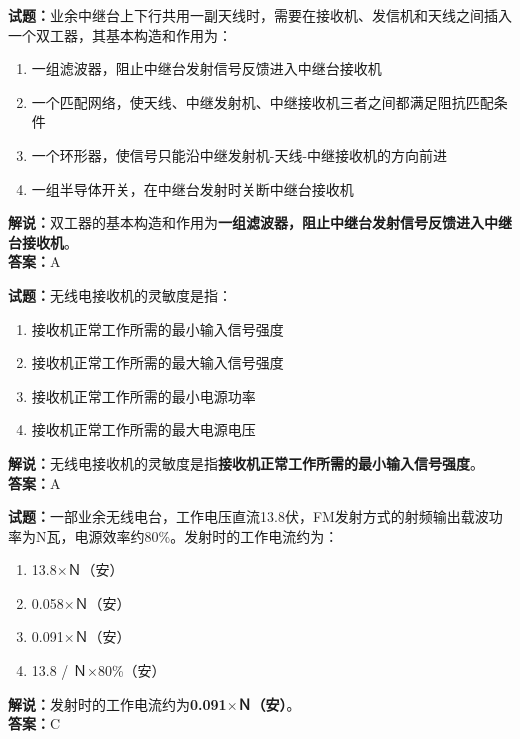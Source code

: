 \documentclass{ctexbook}
\begin{document}
\bigskip


\noindent\textbf{试题：}业余中继台上下行共用一副天线时，需要在接收机、发信机和天线之间插入一个双工器，其基本构造和作用为：
\begin{enumerate}[leftmargin=3em]
\item 一组滤波器，阻止中继台发射信号反馈进入中继台接收机
\item 一个匹配网络，使天线、中继发射机、中继接收机三者之间都满足阻抗匹配条件
\item 一个环形器，使信号只能沿中继发射机-天线-中继接收机的方向前进
\item 一组半导体开关，在中继台发射时关断中继台接收机
\end{enumerate}
\noindent\textbf{解说：}双工器的基本构造和作用为\textbf{一组滤波器，阻止中继台发射信号反馈进入中继台接收机}。\\\noindent\textbf{答案：}A




\bigskip


\noindent\textbf{试题：}无线电接收机的灵敏度是指：
\begin{enumerate}[leftmargin=3em]
\item 接收机正常工作所需的最小输入信号强度
\item 接收机正常工作所需的最大输入信号强度
\item 接收机正常工作所需的最小电源功率
\item 接收机正常工作所需的最大电源电压
\end{enumerate}
\noindent\textbf{解说：}无线电接收机的灵敏度是指\textbf{接收机正常工作所需的最小输入信号强度}。\\\noindent\textbf{答案：}A



\bigskip


\noindent\textbf{试题：}一部业余无线电台，工作电压直流13.8伏，FM发射方式的射频输出载波功率为N瓦，电源效率约80\%。发射时的工作电流约为：
\begin{enumerate}[leftmargin=3em]
\item 13.8$\times$Ｎ（安）
\item 0.058$\times$Ｎ（安）
\item 0.091$\times$Ｎ（安）
\item 13.8 / Ｎ$\times$80\%（安）%
\end{enumerate}
\noindent\textbf{解说：}发射时的工作电流约为\textbf{0.091$\times$Ｎ（安）}。\\\noindent\textbf{答案：}C
\end{document}
